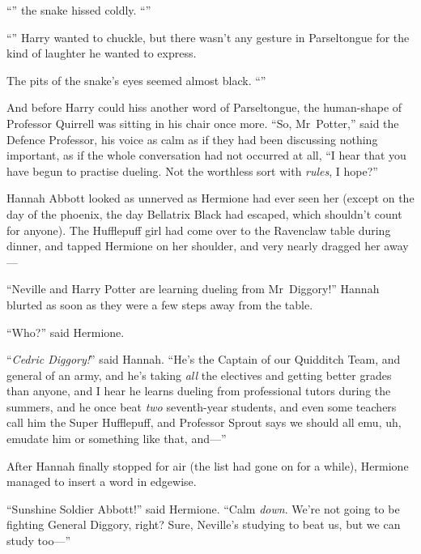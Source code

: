 “” the snake hissed coldly. “”

“” Harry wanted to chuckle, but there wasn’t any gesture in Parseltongue for the kind of laughter he wanted to express.

The pits of the snake’s eyes seemed almost black. “”

And before Harry could hiss another word of Parseltongue, the human-shape of Professor Quirrell was sitting in his chair once more. “So, Mr~Potter,” said the Defence Professor, his voice as calm as if they had been discussing nothing important, as if the whole conversation had not occurred at all, “I hear that you have begun to practise dueling. Not the worthless sort with \emph{rules}, I hope?”

\later

Hannah Abbott looked as unnerved as Hermione had ever seen her (except on the day of the phoenix, the day Bellatrix Black had escaped, which shouldn’t count for anyone). The Hufflepuff girl had come over to the Ravenclaw table during dinner, and tapped Hermione on her shoulder, and very nearly dragged her away—

“Neville and Harry Potter are learning dueling from Mr~Diggory!” Hannah blurted as soon as they were a few steps away from the table.

“Who?” said Hermione.

“\emph{Cedric Diggory!}” said Hannah. “He’s the Captain of our Quidditch Team, and general of an army, and he’s taking \emph{all} the electives and getting better grades than anyone, and I hear he learns dueling from professional tutors during the summers, and he once beat \emph{two} seventh-year students, and even some teachers call him the Super Hufflepuff, and Professor Sprout says we should all emu, uh, emudate him or something like that, and—”

After Hannah finally stopped for air (the list had gone on for a while), Hermione managed to insert a word in edgewise.

“Sunshine Soldier Abbott!” said Hermione. “Calm \emph{down}. We’re not going to be fighting General Diggory, right? Sure, Neville’s studying to beat us, but we can study too—”

